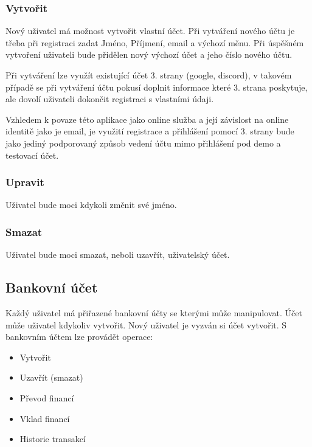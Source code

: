 \documentclass[FM,SP]{tulthesis}
\begin{document}
\subsubsection{Vytvořit}

Nový uživatel má možnost vytvořit vlastní účet. Při vytváření nového účtu je třeba při registraci zadat Jméno, Příjmení, email a výchozí měnu.
Při úspěšném vytvoření uživateli bude přidělen nový výchozí účet a jeho číslo nového účtu.

Při vytváření lze využít existující účet 3. strany (google, discord), v takovém případě se při vytváření účtu pokusí doplnit informace které 3. strana poskytuje, ale dovolí uživateli dokončit registraci s vlastními údaji.

Vzhledem k povaze této aplikace jako online služba a její závislost na online identitě jako je email, je využití registrace a přihlášení pomocí 3. strany bude jako jediný podporovaný způsob vedení účtu mimo přihlášení pod demo a testovací účet.

\subsubsection{Upravit}

Uživatel bude moci kdykoli změnit své jméno.

\subsubsection{Smazat}

Uživatel bude moci smazat, neboli uzavřít, uživatelský účet.

\subsection{Bankovní účet}
Každý uživatel má přiřazené bankovní účty se kterými může manipulovat. Účet může uživatel kdykoliv vytvořit. Nový uživatel je vyzván si účet vytvořit.
S bankovním účtem lze provádět operace:
\begin{itemize}
    \item Vytvořit
    \item Uzavřít (smazat)
    \item Převod financí
    \item Vklad financí
    \item Historie transakcí
\end{itemize}
\end{document}
